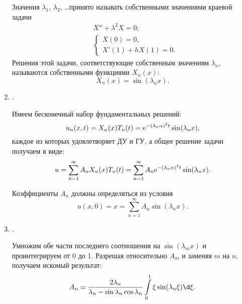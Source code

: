\begin{enumerate}
    Значения \( \lambda_1 \), \( \lambda_2 \), \ldots принято называть
    собственными значениями краевой задачи
    \begin{align*}
        & X'' + \lambda^2 X = 0; \\
        & \left\{ \begin{array}{l}
            X(0) = 0, \\
            X'(1) + hX(1) = 0.
        \end{array} \right.
    \end{align*}
    Решения этой задачи, соответствующие собственным значениям \( \lambda_n \),
    называются собственными функциями \( X_n(x) \):
    \[
        X_n(x) = \sin(\lambda_nx).
    \]
    
    \item {}.
    
    Имеем бесконечный набор фундаментальных решений:
    \[
        u_n(x, t) = X_n(x)T_n(t) = \mathrm{e}^{-(\lambda_n\alpha)^2t}\sin(\lambda_nx),
    \]
    каждое из которых удовлетворяет ДУ и ГУ, а общее решение задачи получаем в
    виде:
    \[
        u = \sum\limits_{n=1}^\infty A_nX_n(x)T_n(t) = \sum\limits_{n=1}^\infty
        A_n\mathrm{e}^{-(\lambda_n\alpha)^2t}\sin(\lambda_nx).
    \]
    
    Коэффициенты \( A_n \) должны определяться из условия
    \[
        u(x, 0) = x = \sum\limits_{n=1}^\infty A_n\sin(\lambda_nx).
    \]
    
    \item {}.
    
    Умножим обе части последнего соотношения на \( \sin(\lambda_mx) \) и
    проинтегрируем от 0 до 1. Разрешая относительно \( A_m \) и заменяя \( m \)
    на \( n \), получаем искомый результат:
    \[
        A_n = \frac{2\lambda_n}{\lambda_n - \sin\lambda_n\cos\lambda_n}
        \int\limits_0^1 \xi\sin(\lambda_n\xi)\d\xi.
    \]
\end{enumerate}


